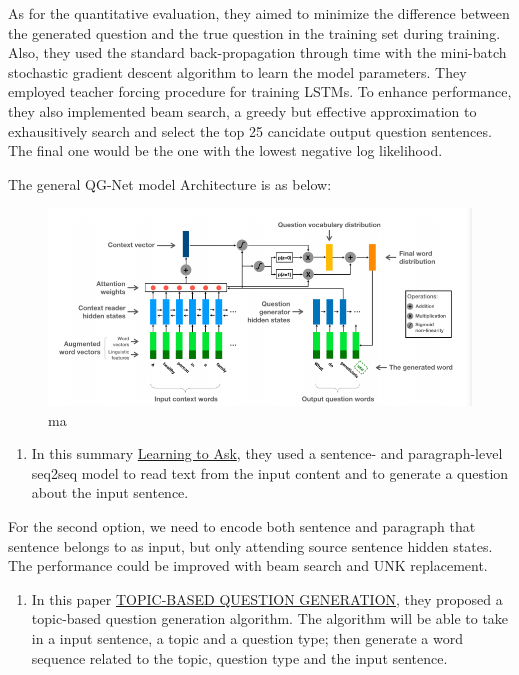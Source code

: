 \documentclass[]{book}
\providecommand{\tightlist}{%
  \setlength{\itemsep}{0pt}\setlength{\parskip}{0pt}}
\theoremstyle{definition}
\theoremstyle{definition}
\theoremstyle{definition}
\theoremstyle{remark}
\begin{document}
As for the quantitative evaluation, they aimed to minimize the
difference between the generated question and the true question in the
training set during training. Also, they used the standard
back-propagation through time with the mini-batch stochastic gradient
descent algorithm to learn the model parameters. They employed teacher
forcing procedure for training LSTMs. To enhance performance, they also
implemented beam search, a greedy but effective approximation to
exhausitively search and select the top 25 cancidate output question
sentences. The final one would be the one with the lowest negative log
likelihood.

The general QG-Net model Architecture is as below:

\begin{figure}
\centering
\includegraphics{img/qgnet.png}
\caption{ma}
\end{figure}

\begin{enumerate}
\def\labelenumi{\arabic{enumi}.}
\setcounter{enumi}{1}
\tightlist
\item
  In this summary
  \href{http://www.cs.cornell.edu/~xdu/papers/acl17_dsc_poster.pdf}{Learning
  to Ask}, they used a sentence- and paragraph-level seq2seq model to
  read text from the input content and to generate a question about the
  input sentence.
\end{enumerate}

For the second option, we need to encode both sentence and paragraph
that sentence belongs to as input, but only attending source sentence
hidden states. The performance could be improved with beam search and
UNK replacement.

\begin{enumerate}
\def\labelenumi{\arabic{enumi}.}
\setcounter{enumi}{2}
\tightlist
\item
  In this paper
  \href{https://openreview.net/pdf?id=rk3pnae0b}{TOPIC-BASED QUESTION
  GENERATION}, they proposed a topic-based question generation
  algorithm. The algorithm will be able to take in a input sentence, a
  topic and a question type; then generate a word sequence related to
  the topic, question type and the input sentence.
\end{enumerate}
\end{document}
